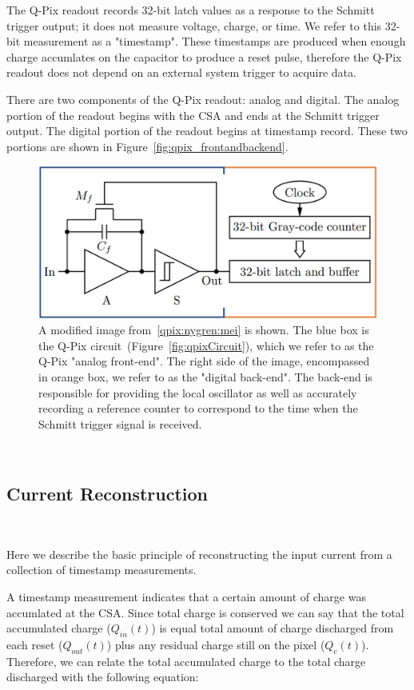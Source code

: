The Q-Pix readout records 32-bit latch values as a response to the Schmitt trigger output; it does not measure voltage, charge, or time.
We refer to this 32-bit measurement as a "timestamp".
These timestamps are produced when enough charge accumlates on the capacitor to produce a reset pulse, therefore the Q-Pix readout does not depend on an external system trigger to acquire data.

There are two components of the Q-Pix readout: analog and digital.
The analog portion of the readout begins with the CSA and ends at the Schmitt trigger output.
The digital portion of the readout begins at timestamp record.
These two portions are shown in Figure~\ref{fig:qpix_frontandbackend}.

\begin{figure}[]
\centering
\includegraphics[width=\textwidth]{images/qpix_circuit_frontandbackend.jpg}
\caption{A modified image from~\ref{qpix:nygren:mei} is shown.
The blue box is the Q-Pix circuit~(Figure~\ref{fig:qpixCircuit}), which we refer to as the Q-Pix "analog front-end".
The right side of the image, encompassed in orange box, we refer to as the "digital back-end".
The back-end is responsible for providing the local oscillator as well as accurately recording a reference counter to correspond to the time when the Schmitt trigger signal is received.
}
\end{figure}~\label{fig:qpix_frontandbackend}

\subsection{Current Reconstruction}~\label{sec:rtds_and_waveforms}

Here we describe the basic principle of reconstructing the input current from a collection of timestamp measurements.

A timestamp measurement indicates that a certain amount of charge was accumlated at the CSA.
Since total charge is conserved we can say that the total accumulated charge ($Q_{in}(t)$) is equal total amount of charge discharged from each reset ($Q_{out}(t)$) plus any residual charge still on the pixel ($Q_{c}(t)$).
Therefore, we can relate the total accumulated charge to the total charge discharged with the following equation:


